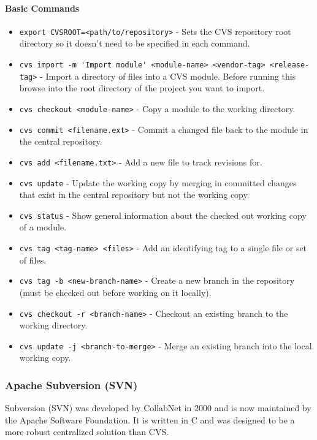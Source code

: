 \paragraph{Basic Commands}

\begin{itemize}
    \item \lstinline{export CVSROOT=<path/to/repository>} - Sets the CVS repository root directory so it doesn't need to be specified in each command.
    \item \lstinline{cvs import -m 'Import module' <module-name> <vendor-tag> <release-tag>} - Import a directory of files into a CVS module. Before running this browse into the root directory of the project you want to import.
    \item \lstinline{cvs checkout <module-name>} - Copy a module to the working directory.
    \item \lstinline{cvs commit <filename.ext>} - Commit a changed file back to the module in the central repository.
    \item \lstinline{cvs add <filename.txt>} - Add a new file to track revisions for.
    \item \lstinline{cvs update} - Update the working copy by merging in committed changes that exist in the central repository but not the working copy.
    \item \lstinline{cvs status} - Show general information about the checked out working copy of a module.
    \item \lstinline{cvs tag <tag-name> <files>} - Add an identifying tag to a single file or set of files.
    \item \lstinline{cvs tag -b <new-branch-name>} - Create a new branch in the repository (must be checked out before working on it locally).
    \item \lstinline{cvs checkout -r <branch-name>} - Checkout an existing branch to the working directory.
    \item \lstinline{cvs update -j <branch-to-merge>} - Merge an existing branch into the local working copy.
\end{itemize}

\subsubsection{Apache Subversion (SVN)}
Subversion (SVN) was developed by CollabNet in 2000 and is now maintained by the Apache Software Foundation. It is written in C and was designed to be a more robust centralized solution than CVS.
